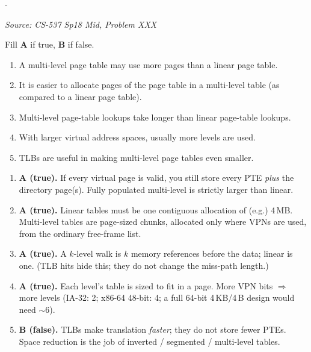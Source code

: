 \documentclass[11pt,a4paper]{article}
\makeatletter
\newcommand{\keepspace}[1]{\par\penalty-100\begingroup
  \setlength{\dimen@}{#1}\dimen@ii\pagegoal\advance\dimen@ii-\pagetotal
  \ifdim\dimen@>\dimen@ii\ifdim\dimen@ii>\z@\vfil\fi\break\fi\endgroup}
\newcounter{qn}[section]
\newenvironment{Qn}[4]{%
  \refstepcounter{qn}\keepspace{7\baselineskip}%
  \begin{tcolorbox}[qboxstyle, title={Q\thesection.\theqn\ \ [#1 \textbar\ #2]\ \ #4}]%
  {\footnotesize\color{g3}\textit{Source: #3}}\par\smallskip%
}{%
  \end{tcolorbox}%
}
\newenvironment{Sol}{%
  \begin{tcolorbox}[sboxstyle, title={Solution}]%
}{%
  \end{tcolorbox}\vspace{0.35em}%
}
\makeatother
\begin{document}
\begin{Qn}{Easy-Medium}{Lect 14}{CS-537 Sp18 Mid, Problem XXX}{Five true/false claims about multi-level page tables}
Fill \textbf{A} if true, \textbf{B} if false.
\begin{enumerate}[(146)]
\item A multi-level page table may use more pages than a linear page table.
\item It is easier to allocate pages of the page table in a multi-level
      table (as compared to a linear page table).
\item Multi-level page-table lookups take longer than linear page-table
      lookups.
\item With larger virtual address spaces, usually more levels are used.
\item TLBs are useful in making multi-level page tables even smaller.
\end{enumerate}
\end{Qn}
\begin{Sol}
\begin{enumerate}[(146)]
\item \textbf{A (true).} If every virtual page is valid, you still store
      every PTE \emph{plus} the directory page(s). Fully populated
      multi-level is strictly larger than linear.
\item \textbf{A (true).} Linear tables must be one contiguous
      allocation of (e.g.) 4\,MB. Multi-level tables are page-sized
      chunks, allocated only where VPNs are used, from the ordinary
      free-frame list.
\item \textbf{A (true).} A $k$-level walk is $k$ memory references
      before the data; linear is one. (TLB hits hide this; they do not
      change the miss-path length.)
\item \textbf{A (true).} Each level's table is sized to fit in a page.
      More VPN bits $\Rightarrow$ more levels (IA-32: 2; x86-64 48-bit:
      4; a full 64-bit 4\,KB/4\,B design would need $\sim 6$).
\item \textbf{B (false).} TLBs make translation \emph{faster}; they do
      not store fewer PTEs. Space reduction is the job of inverted /
      segmented / multi-level tables.
\end{enumerate}
\end{Sol}
\end{document}
